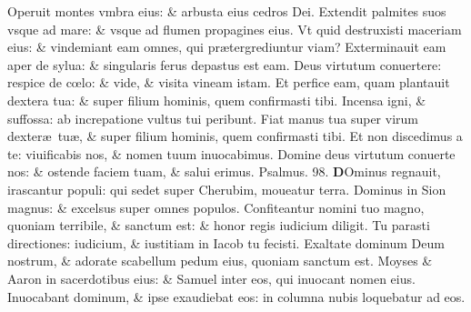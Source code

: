 \documentclass[a5paper,10pt]{book}
\def\ae{æ}
\def\oe{œ}
\begin{document}
\begin{multicols*}{2}
\newline \color{red} O\color{black}peruit montes vmbra eius: \& arbusta eius cedros Dei.
\newline \color{red} E\color{black}xtendit palmites suos vsque ad mare: \& vsque ad flumen propagines eius.
\newline \color{red} V\color{black}t quid destruxisti maceriam eius: \& vindemiant eam omnes, qui pr\ae tergrediuntur viam?
\newline \color{red} E\color{black}xterminauit eam aper de sylua: \& singularis ferus depastus est eam.
\newline \color{red} D\color{black}eus virtutum conuertere: respice de c\oe lo: \& vide, \& visita vineam istam.
\newline \color{red} E\color{black}t perfice eam, quam plantauit dextera tua: \& super filium hominis, quem confirmasti tibi.
\newline \color{red} I\color{black}ncensa igni, \& suffossa: ab increpatione vultus tui peribunt.
\newline \color{red} F\color{black}iat manus tua super virum dexter\ae \ tu\ae , \& super filium hominis, quem confirmasti tibi.
\newline \color{red} E\color{black}t non discedimus a te: viuificabis nos, \& nomen tuum inuocabimus.
\newline \color{red} D\color{black}omine deus virtutum conuerte nos: \& ostende faciem tuam, \& salui erimus. \quad \color{red} Psalmus. \hypertarget{ps98}{98.} \color{black}
\vspace{-.5em}
\lettrine[lines=2]{\bfseries \color{red} D}{}Ominus regnauit, irascantur populi: qui sedet super Cherubim, moueatur terra.
\newline \color{red} D\color{black}ominus in Sion magnus: \& excelsus super omnes populos.
\newline \color{red} C\color{black}onfiteantur nomini tuo magno, quoniam terribile, \& sanctum est: \& honor regis iudicium diligit.
\newline \color{red} T\color{black}u parasti directiones: iudicium, \& iustitiam in Iacob tu fecisti.
\newline \color{red} E\color{black}xaltate dominum Deum nostrum, \& adorate scabellum pedum eius, quoniam sanctum est.
\newline \color{red} M\color{black}oyses \& Aaron in sacerdotibus eius: \& Samuel inter eos, qui inuocant nomen eius.
\newline \color{red} I\color{black}nuocabant dominum, \& ipse exaudiebat eos: in columna nubis loquebatur ad eos.

\end{multicols*}
\end{document}
